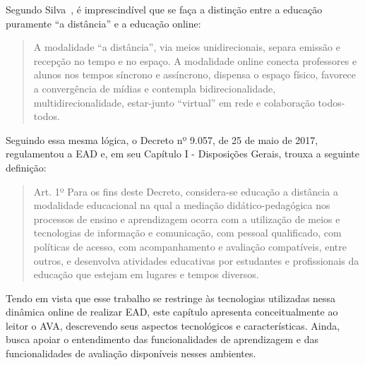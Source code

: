 \newcommand{\texCommand}[1]{\texttt{\textbackslash{#1}}}%

\newcommand{\exemplo}[1]{%
\vspace{\baselineskip}%
\noindent\fbox{\begin{minipage}{\textwidth}#1\end{minipage}}%
\\\vspace{\baselineskip}}%

\newcommand{\exemploVerbatim}[1]{%
\vspace{\baselineskip}%
\noindent\fbox{\begin{minipage}{\textwidth}%
#1\end{minipage}}%
\\\vspace{\baselineskip}}%


\label{chap:ava}
Segundo Silva~\cite{silva2003educacao}, é imprescindível que se faça a distinção entre a educação puramente ``a distância'' e a educação online: 

\begin{quote}
A modalidade “a distância”, via meios unidirecionais, separa emissão e recepção no tempo e no espaço. A modalidade online conecta professores e alunos nos tempos síncrono e assíncrono, dispensa o espaço físico, favorece a convergência de mídias e contempla bidirecionalidade, multidirecionalidade, estar-junto “virtual” em rede e colaboração todos-todos.~\cite{silva2003educacao}
\end{quote}

Seguindo essa mesma lógica, o Decreto nº 9.057, de 25 de maio de 2017, regulamentou a EAD e, em seu Capítulo I - Disposições Gerais, trouxa a seguinte definição:

\begin{quote}
Art. 1º  Para os fins deste Decreto, considera-se educação a distância a modalidade educacional na qual a mediação didático-pedagógica nos processos de ensino e aprendizagem ocorra com a utilização de meios e tecnologias de informação e comunicação, com pessoal qualificado, com políticas de acesso, com acompanhamento e avaliação compatíveis, entre outros, e desenvolva atividades educativas por estudantes e profissionais da educação que estejam em lugares e tempos diversos.~\cite{brasilDec}
\end{quote}

Tendo em vista que esse trabalho se restringe às tecnologias utilizadas nessa dinâmica online de realizar EAD, este capítulo apresenta conceitualmente ao leitor o  \acrfull{AVA}, descrevendo seus aspectos tecnológicos e características. Ainda, busca apoiar o entendimento das funcionalidades de aprendizagem e das funcionalidades de avaliação disponíveis nesses ambientes. 
